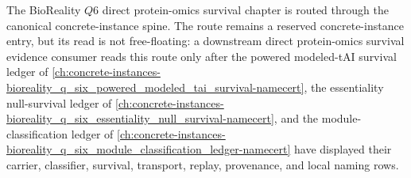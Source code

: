 The BioReality $Q6$ direct protein-omics survival chapter is routed through the canonical concrete-instance spine. The route remains a reserved concrete-instance entry, but its read is not free-floating: a downstream direct protein-omics survival evidence consumer reads this route only after the powered modeled-tAI survival ledger of \autoref{ch:concrete-instances-bioreality_q_six_powered_modeled_tai_survival-namecert}, the essentiality null-survival ledger of \autoref{ch:concrete-instances-bioreality_q_six_essentiality_null_survival-namecert}, and the module-classification ledger of \autoref{ch:concrete-instances-bioreality_q_six_module_classification_ledger-namecert} have displayed their carrier, classifier, survival, transport, replay, provenance, and local naming rows.


